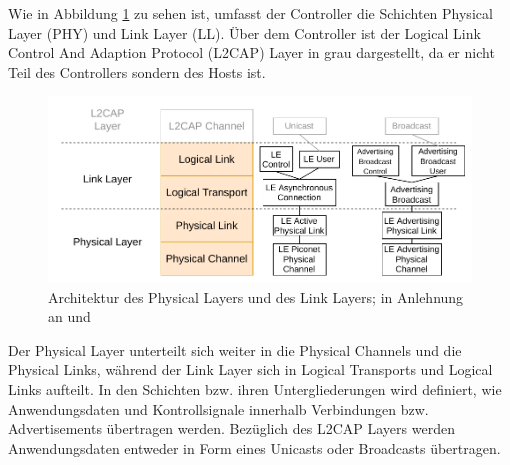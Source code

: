 Wie in Abbildung \ref{fig: controller architektur} zu sehen ist, umfasst der Controller die Schichten Physical Layer (PHY) und Link Layer (LL). Über dem Controller ist der Logical Link Control And Adaption Protocol (L2CAP) Layer in grau dargestellt, da er nicht Teil des Controllers sondern des Hosts ist.

\begin{figure}[H]
    \centering
    \includegraphics[width=1\textwidth]{graphics/controller_layers.pdf}
    \caption[Architektur des Physical Layers und des Link Layers]{Architektur des Physical Layers und des Link Layers; in Anlehnung an \cite{BtSpec4.0_fig_145} und \cite{BtSpec4.0_fig_151}}
    \label{fig: controller architektur}
\end{figure}

Der Physical Layer unterteilt sich weiter in die Physical Channels und die Physical Links, während der Link Layer sich in Logical Transports und Logical Links aufteilt. In den Schichten bzw. ihren Untergliederungen wird definiert, wie Anwendungsdaten und Kontrollsignale innerhalb Verbindungen bzw. Advertisements übertragen werden. Bezüglich des L2CAP Layers werden Anwendungsdaten entweder in Form eines Unicasts oder Broadcasts übertragen.
